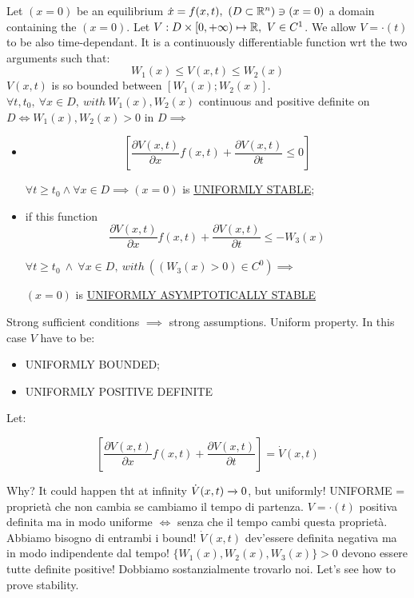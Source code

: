\begin{thrm}
Let $(x=0)$ be an equilibrium $\dot{x}=f(x,t),\ (D \subset \mathbb{R}^n) \ni (x=0)$ a domain containing the $(x=0)$. Let $V:D \times [0,+\infty) \mapsto \mathbb{R},\ V \in C^1$. We allow $V = \mathord{\cdot}(t)$ to be also time-dependant. It is a continuously differentiable function wrt the two arguments such that:
\[
	W_1(x) \leq V(x,t) \leq W_2(x)
\]
$V(x,t)$ is so bounded between $[W_1(x);W_2(x)]$. $\forall t, t_0,\ \forall x \in D,\ with\ W_1(x),W_2(x)$ continuous and positive definite on $D \iff W_1(x),W_2(x) > 0$ in $D \implies$
\begin{itemize}
\item
\[
	[\frac{\partial{V(x,t)}}{\partial{x}}f(x,t) + \frac{\partial{V(x,t)}}{\partial{t}} \leq 0]
\]

$\forall t \geq t_0 \land \forall x \in D \implies (x=0)$ is \underline{UNIFORMLY STABLE};
\item if this function
\[
	\frac{\partial{V(x,t)}}{\partial{x}}f(x,t) + \frac{\partial{V(x,t)}}{\partial{t}} \leq -W_3(x)
\]

$\forall t \geq t_0\ \land\ \forall x \in D,\ with\ ((W_3(x)>0) \in C^0) \implies$

$(x=0)$ is \underline{UNIFORMLY ASYMPTOTICALLY STABLE}
\end{itemize}
\end{thrm}

Strong sufficient conditions $\implies$ strong assumptions. Uniform property. In this case $V$ have to be:
\begin{itemize}
\item UNIFORMLY BOUNDED;
\item UNIFORMLY POSITIVE DEFINITE
\end{itemize}
Let:

\[
	[\frac{\partial{V(x,t)}}{\partial{x}}f(x,t) + \frac{\partial{V(x,t)}}{\partial{t}}] = \dot{V}(x,t)
\]

Why? It could happen tht at infinity $\dot{V}(x,t) \tendsto{} 0$, but uniformly! UNIFORME = proprietà che non cambia se cambiamo il tempo di partenza. $V = \mathord{\cdot}(t)$ positiva definita ma in modo uniforme $\iff$ senza che il tempo cambi questa proprietà. Abbiamo bisogno di entrambi i bound! $\dot{V}(x,t)$ dev'essere definita negativa ma in modo indipendente dal tempo!
$\{W_1(x),W_2(x),W_3(x)\} > 0$ devono essere tutte definite positive! Dobbiamo sostanzialmente trovarlo noi. Let's see how to prove stability.


